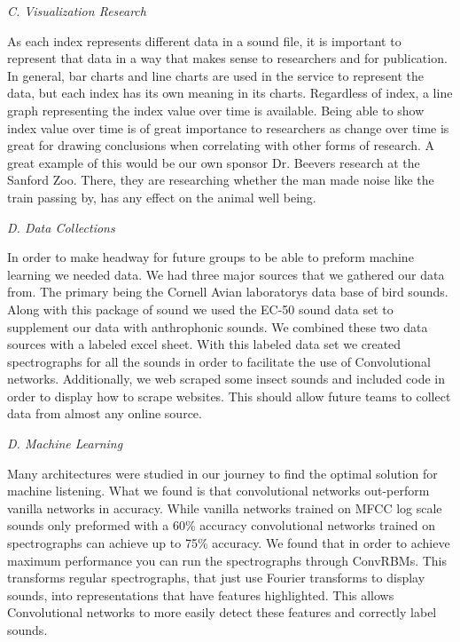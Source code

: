 \begin{flushleft}
\noindent\textit{C. Visualization Research}\par
As each index represents different data in a sound file, it is important to represent that data in a way that makes sense to researchers and for publication. In general, bar charts and line charts are used in the service to represent the data, but each index has its own meaning in its charts. Regardless of index, a line graph representing the index value over time is available. Being able to show index value over time is of great importance to researchers as change over time is great for drawing conclusions when correlating with other forms of research. A great example of this would be our own sponsor Dr. Beever\textquotesingle s research at the Sanford Zoo. There, they are researching whether the man made noise like the train passing by, has any effect on the animal well being.

\noindent\textit{D. Data Collections}\par
In order to make headway for future groups to be able to preform machine learning we needed data. We had three major sources that we gathered our data from. The primary being the Cornell Avian laboratory\textquotesingle s data base of bird sounds. Along with this package of sound we used the EC-50 sound data set to supplement our data with anthrophonic sounds. We combined these two data sources with a labeled excel sheet. With this labeled data set we created spectrographs for all the sounds in order to facilitate the use of Convolutional networks. Additionally, we web scraped some insect sounds and included code in order to display how to scrape websites. This should allow future teams to collect data from almost any online source.

\noindent\textit{D. Machine Learning}\par
Many architectures were studied in our journey to find the optimal solution for machine listening. What we found is that convolutional networks out-perform vanilla networks in accuracy. While vanilla networks trained on MFCC log scale sounds only preformed with a 60\% accuracy convolutional networks trained on spectrographs can achieve up to 75\% accuracy. We found that in order to achieve maximum performance you can run the spectrographs through ConvRBMs. This transforms regular spectrographs, that just use Fourier transforms to display sounds, into representations that have features highlighted. This allows Convolutional networks to more easily detect these features and correctly label sounds.

\end{flushleft}
